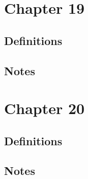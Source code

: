\documentclass[12pt]{article}
\begin{document}
\section{Chapter 19}
\subsection{Definitions}
\subsection{Notes}

\section{Chapter 20}
\subsection{Definitions}
\subsection{Notes}
\end{document}

